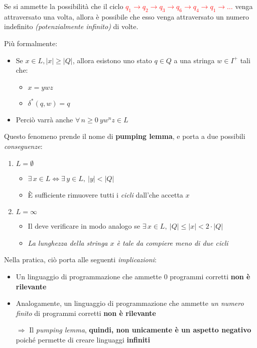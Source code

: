 \documentclass[italian, 10pt]{article}
\begin{document}
Se si ammette la possibilità che il ciclo \textcolor{red}{\(q_1 \rightarrow q_2 \rightarrow q_3 \rightarrow q_6 \rightarrow q_4 \rightarrow q_1 \rightarrow \ldots\)} venga attraversato una volta, allora è possibile che esso venga attraversato un numero indefinito \textit{(potenzialmente infinito)} di volte.

Più formalmente:

\begin{itemize}
  \item Se \(x \in L, |x| \geq |Q| \), allora esistono uno stato \(q \in Q\) a una stringa \(w \in I^+\) tali che:
        \begin{itemize}
          \item \(x = ywz\)
          \item \(\delta^\ast (q, w) = q \)
        \end{itemize}
  \item Perciò varrà anche \(\forall \, n \geq 0 \ y w^n z \in L\)
\end{itemize}

Questo fenomeno prende il nome di \textbf{pumping lemma}, e porta a due possibili \textit{conseguenze}:

\begin{enumerate}
  \item \(L = \emptyset\)
        \begin{itemize}
          \item \(\exists \, x \in L \Leftrightarrow \exists \, y \in L, \ |y| < |Q|\)
          \item È sufficiente rimuovere tutti i \textit{cicli} dall'\FSA che accetta \(x\)
        \end{itemize}
  \item \(L = \infty\)
        \begin{itemize}
          \item Il \FSA deve verificare in modo analogo se \(\exists \, x \in L, \ |Q| \leq |x| < 2 \cdot |Q| \)
          \item \textit{La lunghezza della stringa \(x\) è tale da compiere meno di due cicli}
        \end{itemize}
\end{enumerate}

\bigskip
Nella pratica, ciò porta alle seguenti \textit{implicazioni}:

\begin{itemize}
  \item Un linguaggio di programmazione che ammette \(0\) programmi corretti \textbf{non è rilevante}
  \item Analogamente, un linguaggio di programmazione che ammette \textit{un numero finito} di programmi corretti \textbf{non è rilevante}
  \item[\(\Rightarrow\)] Il \textit{pumping lemma}, \textbf{quindi, non unicamente è un aspetto negativo} poiché permette di creare linguaggi \textbf{infiniti}
\end{itemize}
\end{document}
